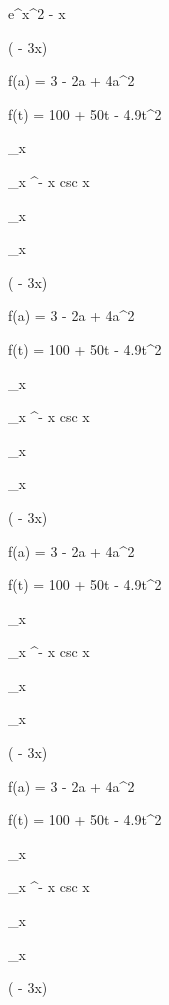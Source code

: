 \documentclass[11pt,a4paper]{article}
\begin{document}
 e^{x^2 - x}

 

 ( - 3x)

f(a) = 3 - 2a + 4a^2

f(t) = 100 + 50t - 4.9t^2

\lim_{x } 

\lim_{x \pi^-} x csc x

\lim_{x } 

\lim_{x } 

 

 ( - 3x)

f(a) = 3 - 2a + 4a^2

f(t) = 100 + 50t - 4.9t^2

\lim_{x } 

\lim_{x \pi^-} x csc x

\lim_{x } 

\lim_{x } 

 

 ( - 3x)

f(a) = 3 - 2a + 4a^2

f(t) = 100 + 50t - 4.9t^2

\lim_{x } 

\lim_{x \pi^-} x csc x

\lim_{x } 

\lim_{x } 

 

 ( - 3x)

f(a) = 3 - 2a + 4a^2

f(t) = 100 + 50t - 4.9t^2

\lim_{x } 

\lim_{x \pi^-} x csc x

\lim_{x } 

\lim_{x } 

 

 ( - 3x)
\end{document}
